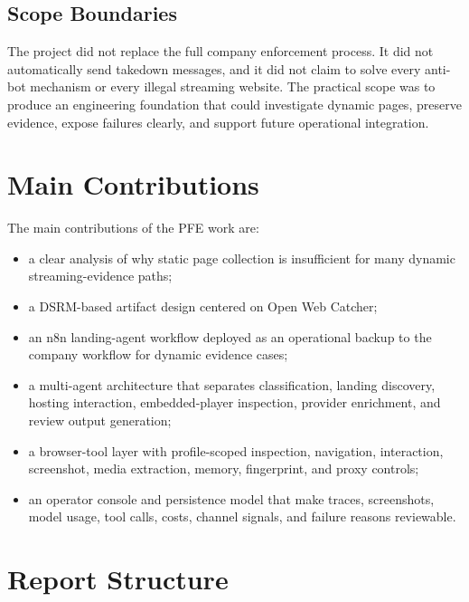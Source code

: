 \subsection{Scope Boundaries}

The project did not replace the full company enforcement process. It did not
automatically send takedown messages, and it did not claim to solve every anti-bot
mechanism or every illegal streaming website. The practical scope was to produce an
engineering foundation that could investigate dynamic pages, preserve evidence, expose
failures clearly, and support future operational integration.

\section{Main Contributions}

The main contributions of the PFE work are:

\begin{itemize}
  \item a clear analysis of why static page collection is insufficient for many dynamic
  streaming-evidence paths;
  \item a DSRM-based artifact design centered on Open Web Catcher;
  \item an n8n landing-agent workflow deployed as an operational backup to the company
  workflow for dynamic evidence cases;
  \item a multi-agent architecture that separates classification, landing discovery,
  hosting interaction, embedded-player inspection, provider enrichment, and review
  output generation;
  \item a browser-tool layer with profile-scoped inspection, navigation, interaction,
  screenshot, media extraction, memory, fingerprint, and proxy controls;
  \item an operator console and persistence model that make traces, screenshots, model
  usage, tool calls, costs, channel signals, and failure reasons reviewable.
\end{itemize}

\section{Report Structure}

